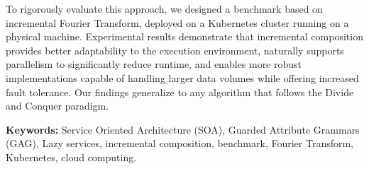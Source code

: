 To rigorously evaluate this approach, we designed a benchmark based on incremental Fourier Transform, deployed on a Kubernetes cluster running on a physical machine. Experimental results demonstrate that incremental composition provides better adaptability to the execution environment, naturally supports parallelism to significantly reduce runtime, and enables more robust implementations capable of handling larger data volumes while offering increased fault tolerance. Our findings generalize to any algorithm that follows the Divide and Conquer paradigm.

\vspace{1cm}
\noindent\textbf{Keywords:} Service Oriented Architecture (SOA), Guarded Attribute Grammars (GAG), Lazy services, incremental composition, benchmark, Fourier Transform, Kubernetes, cloud computing.





\myCleanStarChapterEnd
